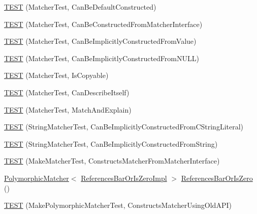 \begin{DoxyCompactItemize}
\item 
\hyperlink{namespacetesting_1_1gmock__matchers__test_a8843a1545b9e09d73b565cf94f2e5f8b}{T\+E\+ST} (Matcher\+Test, Can\+Be\+Default\+Constructed)
\item 
\hyperlink{namespacetesting_1_1gmock__matchers__test_a3dee288df7e811f817850a5187c42669}{T\+E\+ST} (Matcher\+Test, Can\+Be\+Constructed\+From\+Matcher\+Interface)
\item 
\hyperlink{namespacetesting_1_1gmock__matchers__test_a2bd9ad37a8b9f03b10a15ed322c3249c}{T\+E\+ST} (Matcher\+Test, Can\+Be\+Implicitly\+Constructed\+From\+Value)
\item 
\hyperlink{namespacetesting_1_1gmock__matchers__test_a0de94b029c8a13180276e411f4d75f7f}{T\+E\+ST} (Matcher\+Test, Can\+Be\+Implicitly\+Constructed\+From\+N\+U\+LL)
\item 
\hyperlink{namespacetesting_1_1gmock__matchers__test_ab37bd0e535503a8f39e34b0554b2fb28}{T\+E\+ST} (Matcher\+Test, Is\+Copyable)
\item 
\hyperlink{namespacetesting_1_1gmock__matchers__test_ae85f2ec21822e884ac9ff58741d420d2}{T\+E\+ST} (Matcher\+Test, Can\+Describe\+Itself)
\item 
\hyperlink{namespacetesting_1_1gmock__matchers__test_aee6cef32b22ddd6ce8b87578c3de4198}{T\+E\+ST} (Matcher\+Test, Match\+And\+Explain)
\item 
\hyperlink{namespacetesting_1_1gmock__matchers__test_a17fb479932a88dc4e334327c5e12c8d6}{T\+E\+ST} (String\+Matcher\+Test, Can\+Be\+Implicitly\+Constructed\+From\+C\+String\+Literal)
\item 
\hyperlink{namespacetesting_1_1gmock__matchers__test_a6786eca17f1fc4d6250470cc21ec79f1}{T\+E\+ST} (String\+Matcher\+Test, Can\+Be\+Implicitly\+Constructed\+From\+String)
\item 
\hyperlink{namespacetesting_1_1gmock__matchers__test_ae433e93168010d7316b40ef4a5088d09}{T\+E\+ST} (Make\+Matcher\+Test, Constructs\+Matcher\+From\+Matcher\+Interface)
\item 
\hyperlink{classtesting_1_1_polymorphic_matcher}{Polymorphic\+Matcher}$<$ \hyperlink{classtesting_1_1gmock__matchers__test_1_1_references_bar_or_is_zero_impl}{References\+Bar\+Or\+Is\+Zero\+Impl} $>$ \hyperlink{namespacetesting_1_1gmock__matchers__test_ac07376a5dff45a905b7eb96e621ce3aa}{References\+Bar\+Or\+Is\+Zero} ()
\item 
\hyperlink{namespacetesting_1_1gmock__matchers__test_aad0604e47fea147ae133d134b4606a26}{T\+E\+ST} (Make\+Polymorphic\+Matcher\+Test, Constructs\+Matcher\+Using\+Old\+A\+PI)

\end{DoxyCompactItemize}

